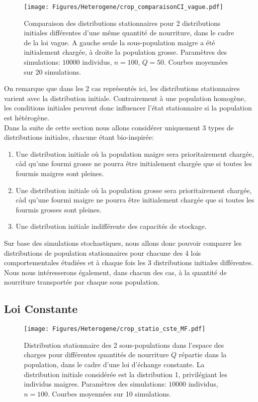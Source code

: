 \begin{figure}[h!]
\centering
\texttt{[image: Figures/Heterogene/crop\_comparaisonCI\_vague.pdf]}
\caption{Comparaison des distributions stationnaires pour 2 distributions initiales différentes d'une même quantité de nourriture, dans le cadre de la loi vague. A gauche seule la sous-population maigre a été initialement chargée, à droite la population grosse. Paramètres des simulations: $10000$ individus, $n=100$, $Q = 50$. Courbes moyennées sur 20 simulations.}
\label{comparaison_CI_vague}
\end{figure}

On remarque que dans les 2 cas représentés ici, les distributions stationnaires varient avec la distribution initiale. Contrairement à une population homogène, les conditions initiales peuvent donc influencer l'état stationnaire si la population est hétérogène.\\

Dans la suite de cette section nous allons considérer uniquement 3 types de distributions initiales, chacune étant bio-inspirée:
\begin{enumerate}
\item Une distribution initiale où la population maigre sera prioritairement chargée, càd qu'une fourmi grosse ne pourra être initialement chargée que si toutes les fourmis maigres sont pleines.
\item Une distribution initiale où la population grosse sera prioritairement chargée, càd qu'une fourmi maigre ne pourra être initialement chargée que si toutes les fourmis grosses sont pleines.
\item Une distribution initiale indifférente des capacités de stockage.
\end{enumerate}


Sur base des simulations stochastiques, nous allons donc pouvoir comparer les distributions de population stationnaires pour chacune des 4 lois comportementales étudiées et à chaque fois les 3 distributions initiales différentes. Nous nous intéresserons également, dans chacun des cas, à la quantité de nourriture transportée par chaque sous population.

\pagebreak
\subsection{Loi Constante}


\begin{figure}[h!]
\centering
\texttt{[image: Figures/Heterogene/crop\_statio\_cste\_MF.pdf]}
\caption{Distribution stationnaire des 2 sous-populations dans l'espace des charges pour différentes quantités de nourriture $Q$ répartie dans la population, dans le cadre d'une loi d'échange constante. La distribution initiale considérée est la distribution 1, privilégiant les individus maigres. Paramètres des simulations: $10000$ individus, $n=100$. Courbes moyennées sur 10 simulations.}
\label{statio_cste_MF}
\end{figure}

